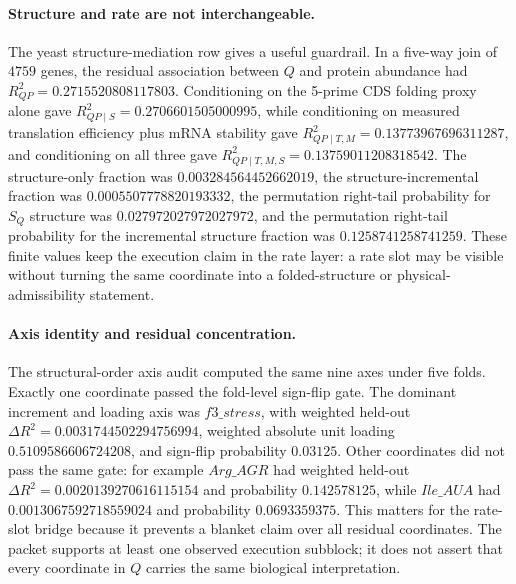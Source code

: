 \paragraph{Structure and rate are not interchangeable.}
The yeast structure-mediation row gives a useful guardrail. In a five-way join of $4759$ genes, the residual association between $Q$ and protein abundance had $R^2_{QP}=0.2715520808117803$. Conditioning on the 5-prime CDS folding proxy alone gave $R^2_{QP\mid S}=0.2706601505000995$, while conditioning on measured translation efficiency plus mRNA stability gave $R^2_{QP\mid T,M}=0.13773967696311287$, and conditioning on all three gave $R^2_{QP\mid T,M,S}=0.13759011208318542$. The structure-only fraction was $0.003284564452662019$, the structure-incremental fraction was $0.0005507778820193332$, the permutation right-tail probability for $S_Q$ structure was $0.027972027972027972$, and the permutation right-tail probability for the incremental structure fraction was $0.1258741258741259$. These finite values keep the execution claim in the rate layer: a rate slot may be visible without turning the same coordinate into a folded-structure or physical-admissibility statement.

\paragraph{Axis identity and residual concentration.}
The structural-order axis audit computed the same nine axes under five folds. Exactly one coordinate passed the fold-level sign-flip gate. The dominant increment and loading axis was $f3\_stress$, with weighted held-out $\Delta R^2=0.0031744502294756994$, weighted absolute unit loading $0.5109586606724208$, and sign-flip probability $0.03125$. Other coordinates did not pass the same gate: for example $Arg\_AGR$ had weighted held-out $\Delta R^2=0.0020139270616115154$ and probability $0.142578125$, while $Ile\_AUA$ had $0.0013067592718559024$ and probability $0.0693359375$. This matters for the rate-slot bridge because it prevents a blanket claim over all residual coordinates. The packet supports at least one observed execution subblock; it does not assert that every coordinate in $Q$ carries the same biological interpretation.

